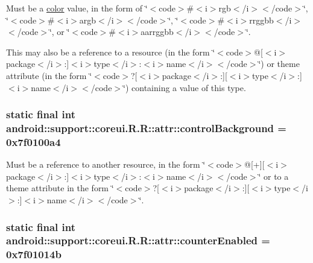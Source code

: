 Must be a \hyperlink{classandroid_1_1support_1_1coreui_1_1_r_1_1color}{color} value, in the form of \char`\"{}$<$code$>$\#$<$i$>$rgb$<$/i$>$$<$/code$>$\char`\"{}, \char`\"{}$<$code$>$\#$<$i$>$argb$<$/i$>$$<$/code$>$\char`\"{}, \char`\"{}$<$code$>$\#$<$i$>$rrggbb$<$/i$>$$<$/code$>$\char`\"{}, or \char`\"{}$<$code$>$\#$<$i$>$aarrggbb$<$/i$>$$<$/code$>$\char`\"{}. 

This may also be a reference to a resource (in the form \char`\"{}$<$code$>$@\mbox{[}$<$i$>$package$<$/i$>$:\mbox{]}$<$i$>$type$<$/i$>$:$<$i$>$name$<$/i$>$$<$/code$>$\char`\"{}) or theme attribute (in the form \char`\"{}$<$code$>$?\mbox{[}$<$i$>$package$<$/i$>$:\mbox{]}\mbox{[}$<$i$>$type$<$/i$>$:\mbox{]}$<$i$>$name$<$/i$>$$<$/code$>$\char`\"{}) containing a value of this type. \hypertarget{classandroid_1_1support_1_1coreui_1_1_r_1_1attr_23677505f85ac990a5dc3cc37559309a}{
\subsubsection[{controlBackground}]{\setlength{\rightskip}{0pt plus 5cm}static final int android::support::coreui.R.R::attr::controlBackground = 0x7f0100a4}}
\label{classandroid_1_1support_1_1coreui_1_1_r_1_1attr_23677505f85ac990a5dc3cc37559309a}


Must be a reference to another resource, in the form \char`\"{}$<$code$>$@\mbox{[}+\mbox{]}\mbox{[}$<$i$>$package$<$/i$>$:\mbox{]}$<$i$>$type$<$/i$>$:$<$i$>$name$<$/i$>$$<$/code$>$\char`\"{} or to a theme attribute in the form \char`\"{}$<$code$>$?\mbox{[}$<$i$>$package$<$/i$>$:\mbox{]}\mbox{[}$<$i$>$type$<$/i$>$:\mbox{]}$<$i$>$name$<$/i$>$$<$/code$>$\char`\"{}. \hypertarget{classandroid_1_1support_1_1coreui_1_1_r_1_1attr_c4e8a35ec1f126122c0cb834f0c4aa70}{
\subsubsection[{counterEnabled}]{\setlength{\rightskip}{0pt plus 5cm}static final int android::support::coreui.R.R::attr::counterEnabled = 0x7f01014b}}
\label{classandroid_1_1support_1_1coreui_1_1_r_1_1attr_c4e8a35ec1f126122c0cb834f0c4aa70}


